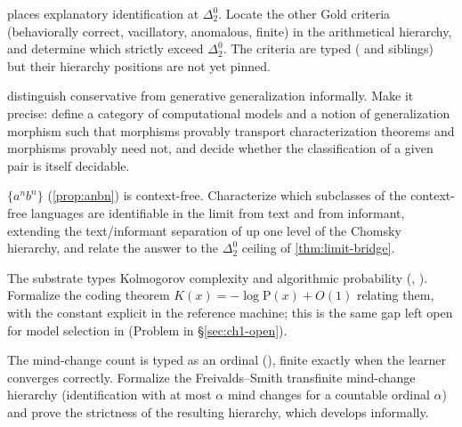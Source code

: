 \begin{openprob}
\label{op:criterion-hierarchy}
 places explanatory identification at $\Delta^0_2$. Locate the other Gold criteria (behaviorally correct, vacillatory, anomalous, finite) in the arithmetical hierarchy, and determine which strictly exceed $\Delta^0_2$. The criteria are typed ( and siblings) but their hierarchy positions are not yet pinned.
\end{openprob}

\begin{openprob}
\label{op:restricts-functor}
 distinguish conservative from generative generalization informally. Make it precise: define a category of computational models and a notion of generalization morphism such that  morphisms provably transport characterization theorems and  morphisms provably need not, and decide whether the classification of a given pair is itself decidable.
\end{openprob}

\begin{openprob}
\label{op:cfl-learnable}
$\{a^n b^n\}$ (\cref{prop:anbn}) is context-free. Characterize which subclasses of the context-free languages are identifiable in the limit from text and from informant, extending the text/informant separation of  up one level of the Chomsky hierarchy, and relate the answer to the $\Delta^0_2$ ceiling of \cref{thm:limit-bridge}.
\end{openprob}

\begin{openprob}
\label{op:coding-theorem}
The substrate types Kolmogorov complexity and algorithmic probability (, ). Formalize the coding theorem $K(x) = -\log \mathrm{P}(x) + O(1)$ relating them, with the constant explicit in the reference machine; this is the same gap left open for model selection in  (Problem in \S\ref{sec:ch1-open}).
\end{openprob}

\begin{openprob}
\label{op:mind-change-ordinals}
The mind-change count is typed as an ordinal (), finite exactly when the learner converges correctly. Formalize the Freivalds--Smith transfinite mind-change hierarchy (identification with at most $\alpha$ mind changes for a countable ordinal $\alpha$) and prove the strictness of the resulting hierarchy, which  develops informally.
\end{openprob}

